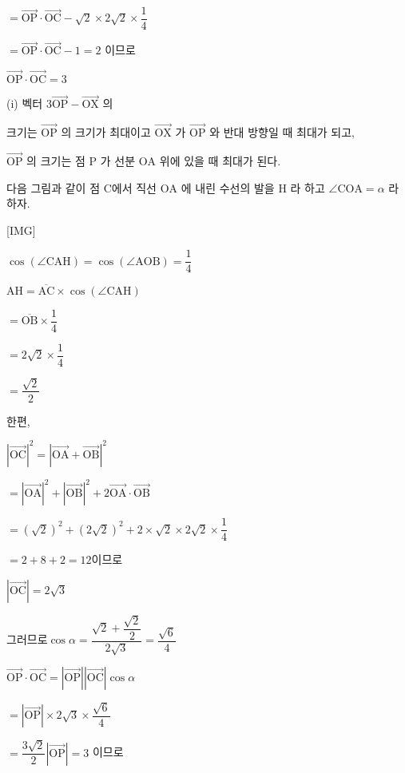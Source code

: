 \documentclass{oblivoir}
\begin{document}
$=\overrightarrow{\mathrm{OP}} \cdot \overrightarrow{\mathrm{OC}}-\sqrt{2} \times 2 \sqrt{2} \times \dfrac{1}{4}$

$=\overrightarrow{\mathrm{OP}} \cdot \overrightarrow{\mathrm{OC}}-1=2$
이므로

$\overrightarrow{\mathrm{OP}} \cdot \overrightarrow{\mathrm{OC}}=3$

(i) 벡터 $3 \overrightarrow{\mathrm{OP}}-\overrightarrow{\mathrm{OX}}$ 의

크기는 $\overrightarrow{\mathrm{OP}}$ 의 크기가 최대이고 $\overrightarrow{\mathrm{OX}}$ 가 $\overrightarrow{\mathrm{OP}}$ 와 반대 방향일 때 최대가 되고,

$\overrightarrow{\mathrm{OP}}$ 의 크기는 점 $\mathrm{P}$ 가 선분 $\mathrm{OA}$ 위에 있을 때 최대가 된다.

다음 그림과 같이 점 $\mathrm{C}$에서 직선 $\mathrm{OA}$ 에 내린 수선의 발을 $\mathrm{H}$ 라 하고 $\angle \mathrm{COA}=\alpha$ 라 하자.

[IMG]

$\cos (\angle \mathrm{CAH})=\cos (\angle \mathrm{AOB})=\dfrac{1}{4}$

$\mathrm{AH} =\overline{\mathrm{AC}} \times \cos (\angle \mathrm{CAH})$

$=\overline{\mathrm{OB}} \times \dfrac{1}{4}$

$=2 \sqrt{2} \times \dfrac{1}{4}$

$=\dfrac{\sqrt{2}}{2} $

한편,

$|\overrightarrow{\mathrm{OC}}|^{2}=|\overrightarrow{\mathrm{OA}}+\overrightarrow{\mathrm{OB}}|^{2}$

$=|\overrightarrow{\mathrm{OA}}|^{2}+|\overrightarrow{\mathrm{OB}}|^{2}+2 \overrightarrow{\mathrm{OA}} \cdot \overrightarrow{\mathrm{OB}}$

$=(\sqrt{2})^{2}+(2 \sqrt{2})^{2}+2 \times \sqrt{2} \times 2 \sqrt{2} \times \dfrac{1}{4}$

$=2+8+2=12$이므로

$|\overrightarrow{\mathrm{OC}}|=2 \sqrt{3}$

그러므로$\cos \alpha=\dfrac{\sqrt{2}+\dfrac{\sqrt{2}}{2}}{2 \sqrt{3}}=\dfrac{\sqrt{6}}{4}$

$\overrightarrow{\mathrm{OP}} \cdot \overrightarrow{\mathrm{OC}}=|\overrightarrow{\mathrm{OP}}||\overrightarrow{\mathrm{OC}}| \cos \alpha$

$ =|\overrightarrow{\mathrm{OP}}| \times 2 \sqrt{3} \times \dfrac{\sqrt{6}}{4} $

$=\dfrac{3 \sqrt{2}}{2}|\overrightarrow{\mathrm{OP}}|=3$ 이므로
\end{document}
